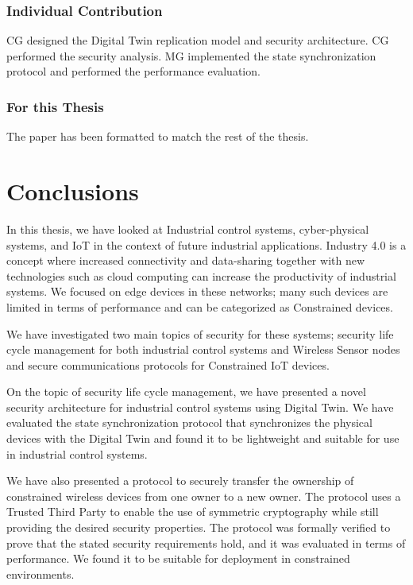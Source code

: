 \subsubsection{Individual Contribution}
CG designed the Digital Twin replication model and security architecture. CG performed the security analysis. MG implemented the state synchronization protocol and performed the performance evaluation.
\subsubsection{For this Thesis}
The paper has been formatted to match the rest of the thesis.

\newpage

\section{Conclusions}
In this thesis, we have looked at Industrial control systems, cyber-physical systems, and IoT in the context of future industrial applications. Industry 4.0 is a concept where increased connectivity and data-sharing together with new technologies such as cloud computing can increase the productivity of industrial systems. We focused on edge devices in these networks; many such devices are limited in terms of performance and can be categorized as Constrained devices.

We have investigated two main topics of security for these systems; security life cycle management for both industrial control systems and Wireless Sensor nodes and secure communications protocols for Constrained IoT devices. 

On the topic of security life cycle management, we have presented a novel security architecture for industrial control systems using Digital Twin. We have evaluated the state synchronization protocol that synchronizes the physical devices with the Digital Twin and found it to be lightweight and suitable for use in industrial control systems.

We have also presented a protocol to securely transfer the ownership of constrained wireless devices from one owner to a new owner. The protocol uses a Trusted Third Party to enable the use of symmetric cryptography while still providing the desired security properties. The protocol was formally verified to prove that the stated security requirements hold, and it was evaluated in terms of performance. We found it to be suitable for deployment in constrained environments.

